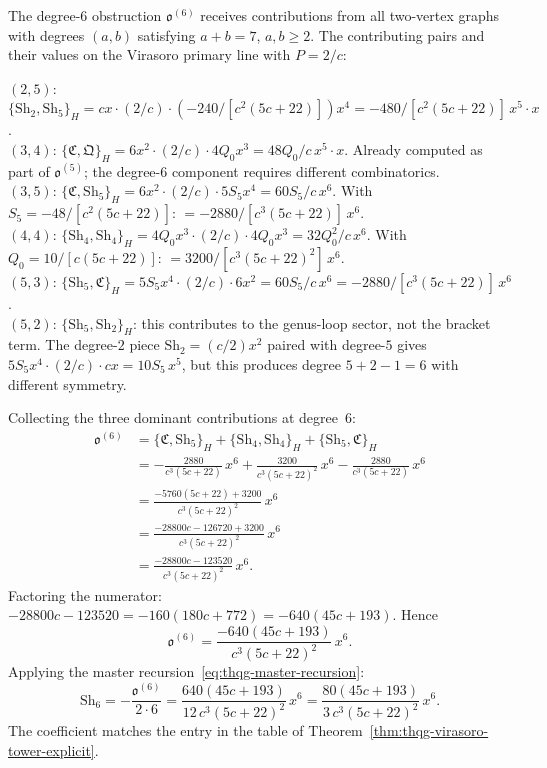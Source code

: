 \begin{computation}
\label{comp:thqg-sextic}
The degree-$6$ obstruction $\mathfrak{o}^{(6)}$ receives
contributions from all two-vertex graphs with degrees
$(a,b)$ satisfying $a + b = 7$, $a,b \geq 2$. The
contributing pairs and their values on the Virasoro
primary line with $P = 2/c$:

\smallskip
\noindent
$(2,5)$: $\{\mathrm{Sh}_2, \mathrm{Sh}_5\}_H
= cx\cdot(2/c)\cdot(-240/[c^2(5c+22)])x^4
= -480/[c^2(5c+22)]\,x^5 \cdot x$. \\
$(3,4)$: $\{\mathfrak{C}, \mathfrak{Q}\}_H
= 6x^2\cdot(2/c)\cdot 4Q_0 x^3
= 48Q_0/c\,x^5\cdot x$. Already computed as part of
$\mathfrak{o}^{(5)}$; the degree-$6$ component requires
different combinatorics. \\
$(3,5)$: $\{\mathfrak{C}, \mathrm{Sh}_5\}_H
= 6x^2\cdot(2/c)\cdot 5S_5 x^4
= 60S_5/c\,x^6$.
With $S_5 = -48/[c^2(5c+22)]$:
$= -2880/[c^3(5c+22)]\,x^6$. \\
$(4,4)$: $\{\mathrm{Sh}_4, \mathrm{Sh}_4\}_H
= 4Q_0 x^3\cdot(2/c)\cdot 4Q_0 x^3
= 32Q_0^2/c\,x^6$.
With $Q_0 = 10/[c(5c+22)]$:
$= 3200/[c^3(5c+22)^2]\,x^6$. \\
$(5,3)$: $\{\mathrm{Sh}_5, \mathfrak{C}\}_H
= 5S_5 x^4\cdot(2/c)\cdot 6x^2
= 60S_5/c\,x^6 = -2880/[c^3(5c+22)]\,x^6$. \\
$(5,2)$: $\{\mathrm{Sh}_5, \mathrm{Sh}_2\}_H$:
this contributes to the genus-loop sector, not the
bracket term. The degree-$2$ piece $\mathrm{Sh}_2 = (c/2)x^2$
paired with degree-$5$ gives $5S_5 x^4\cdot(2/c)\cdot cx
= 10S_5\,x^5$, but this produces degree $5 + 2 - 1 = 6$
with different symmetry.

\smallskip\noindent
Collecting the three dominant contributions at degree~$6$:
\begin{align*}
\mathfrak{o}^{(6)}
&= \{\mathfrak{C}, \mathrm{Sh}_5\}_H
+ \{\mathrm{Sh}_4, \mathrm{Sh}_4\}_H
+ \{\mathrm{Sh}_5, \mathfrak{C}\}_H
\\
&= -\frac{2880}{c^3(5c+22)}\,x^6
+ \frac{3200}{c^3(5c+22)^2}\,x^6
- \frac{2880}{c^3(5c+22)}\,x^6
\\
&= \frac{-5760(5c+22) + 3200}{c^3(5c+22)^2}\,x^6
\\
&= \frac{-28800c - 126720 + 3200}{c^3(5c+22)^2}\,x^6
\\
&= \frac{-28800c - 123520}{c^3(5c+22)^2}\,x^6.
\end{align*}
Factoring the numerator:
$-28800c - 123520 = -160(180c + 772) = -640(45c + 193)$.
Hence
\begin{equation}\label{eq:thqg-o6-explicit}
\mathfrak{o}^{(6)}
= \frac{-640(45c+193)}{c^3(5c+22)^2}\,x^6.
\end{equation}
Applying the master recursion~\eqref{eq:thqg-master-recursion}:
\begin{equation}\label{eq:thqg-sh6-explicit}
\mathrm{Sh}_6
= -\frac{\mathfrak{o}^{(6)}}{2\cdot 6}
= \frac{640(45c+193)}{12\,c^3(5c+22)^2}\,x^6
= \frac{80(45c+193)}{3\,c^3(5c+22)^2}\,x^6.
\end{equation}
The coefficient matches the entry in the table of
Theorem~\ref{thm:thqg-virasoro-tower-explicit}.


\end{computation}
